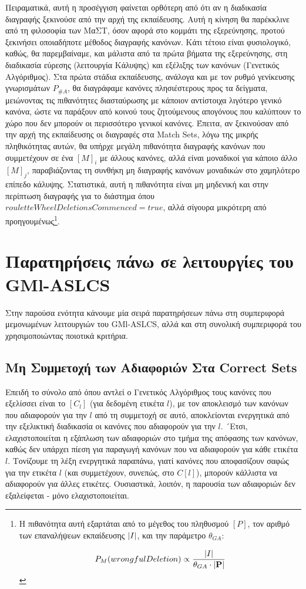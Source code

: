 Πειραματικά, αυτή η προσέγγιση φαίνεται ορθότερη από ότι αν η διαδικασία διαγραφής ξεκινούσε από την αρχή της εκπαίδευσης. Αυτή η κίνηση θα παρέκκλινε από τη φιλοσοφία των ΜαΣΤ, όσον αφορά στο κομμάτι της εξερεύνησης, προτού ξεκινήσει οποιαδήποτε μέθοδος διαγραφής κανόνων. Κάτι τέτοιο είναι φυσιολογικό, καθώς, θα παρεμβαίναμε, και μάλιστα από τα πρώτα βήματα της εξερεύνησης, στη διαδικασία εύρεσης (λειτουργία Κάλυψης) και εξέλιξης των κανόνων (Γενετικός Αλγόριθμος). Στα πρώτα στάδια εκπαίδευσης, ανάλογα και με τον ρυθμό γενίκευσης γνωρισμάτων $P_{\#A}$, θα διαγράφαμε κανόνες πλησιέστερους προς τα δείγματα, μειώνοντας τις πιθανότητες διασταύρωσης με κάποιον αντίστοιχα λιγότερο γενικό κανόνα, ώστε να παράξουν από κοινού τους ζητούμενους απογόνους που καλύπτουν το χώρο που δεν μπορούν οι περισσότερο γενικοί κανόνες. Έπειτα, αν ξεκινούσαν από την αρχή της εκπαίδευσης οι διαγραφές στα Match Sets, λόγω της μικρής πληθικότητας αυτών, θα υπήρχε μεγάλη πιθανότητα διαγραφής κανόνων που συμμετέχουν σε ένα $[M]_{i}$ με άλλους κανόνες, αλλά είναι μοναδικοί για κάποιο άλλο $[M]_{j}$, παραβιάζοντας τη συνθήκη μη διαγραφής κανόνων μοναδικών στο χαμηλότερο επίπεδο κάλυψης. Στατιστικά, αυτή η πιθανότητα είναι μη μηδενική και στην περίπτωση διαγραφής για το διάστημα όπου $rouletteWheelDeletionsCommenced = true$, αλλά σίγουρα μικρότερη από προηγουμένως\footnote{Η πιθανότητα αυτή εξαρτάται από το μέγεθος του πληθυσμού $[P]$, τον αριθμό των επαναλήψεων εκπαίδευσης $\lvert I\rvert$, και την παράμετρο $\theta_{GA}$: 

\begin{equation}
P_{M}(wrongfulDeletion) \propto \dfrac{\lvert I\rvert}{\theta_{GA} \cdot \lvert\textbf{P}\rvert}
\end{equation}}.




\section{Παρατηρήσεις πάνω σε λειτουργίες του GMl-ASLCS }
Στην παρούσα ενότητα κάνουμε μία σειρά παρατηρήσεων πάνω στη συμπεριφορά μεμονωμένων λειτουργιών του GMl-ASLCS, αλλά και στη συνολική συμπεριφορά του χρησιμοποιώντας ποιοτικά κριτήρια.

\subsection{Μη Συμμετοχή των Αδιαφοριών Στα Correct Sets}
\label{subsec:gmlASLCSCorrectSetsIndiference}
Επειδή το σύνολο από όπου αντλεί ο Γενετικός Αλγόριθμος τους κανόνες που εξελίσσει είναι το $[C_{l}]$ (για δεδομένη ετικέτα $l$), με τον αποκλεισμό των κανόνων που αδιαφορούν για την $l$ από τη συμμετοχή σε αυτό, αποκλείονται ενεργητικά από την εξελικτική διαδικασία οι κανόνες που αδιαφορούν για την $l$. ´Ετσι, ελαχιστοποιείται η εξάπλωση των αδιαφοριών στο τμήμα της απόφασης των κανόνων, καθώς δεν υπάρχει πίεση για παραγωγή κανόνων που να αδιαφορούν για κάθε ετικέτα $l$. Τονίζουμε τη λέξη ενεργητικά παραπάνω, γιατί κανόνες που αποφασίζουν σαφώς για την ετικέτα $l$ (και συμμετέχουν, συνεπώς, στο $C[l]$), μπορούν κάλλιστα να αδιαφορούν για άλλες ετικέτες. Ουσιαστικά, λοιπόν, η παρουσία των αδιαφοριών δεν εξαλείφεται - μόνο ελαχιστοποιείται. 

